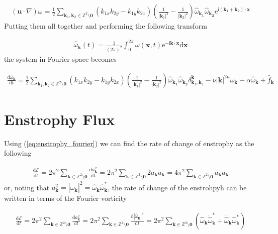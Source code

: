 \documentclass[9pt]{article}
\newcommand{\der}[2]{\frac{\mathrm{d}#1}{\mathrm{d}#2}}          	 %
\newcommand{\ii}{\mathrm{i}}      								  %
\newcommand{\e}{\mathrm{e}}      								  %
\newcommand{\bfu}{\mathbf{u}}											%
\newcommand{\omegahat}[1]{\hat{\omega}_{ \mathbf{#1} } }								%
\newcommand{\bfx}{\mathbf{x}}								%
\newcommand{\bfk}{\mathbf{k}}								%
\newcommand{\bfkn}[1]{\mathbf{k}_{#1}}								%
\begin{document}
\begin{align}
	\left(\bfu \cdot \nabla\right) \omega = \frac{1}{2} \sum_{\mathbf{k}_1, \mathbf{k}_2\in \mathbb{Z}^2\setminus \mathbf{0}}\left(k_{1x}k_{2y} - k_{1y}k_{2x}\right) \left(\frac{1}{|\bfkn{1}|^2} - \frac{1}{|\bfkn{2}|^2}\right) \omegahat{\bfkn{1}}\omegahat{\bfkn{2}} \e^{\ii (\bfkn{1} + \bfkn{2}) \cdot \bfx}
\end{align}
Putting them all together and performing the following transform

\begin{align}
	\omegahat{\bfk} (t)= \frac{1}{(2\pi)^2}\int_0^{2\pi}\omega(\bfx, t)\e^{-\ii \bfk \cdot \bfx}\mathrm{d}\mathbf{x}
\end{align}
the system in Fourier space becomes

\begin{align}
	\der{\omegahat{k}}{t} = \frac{1}{2}	\sum_{\mathbf{k}_1, \mathbf{k}_2\in \mathbb{Z}^2\setminus \mathbf{0}}\left(k_{1x}k_{2y} - k_{1y}k_{2x}\right) \left(\frac{1}{|\bfkn{1}|^2} - \frac{1}{|\bfkn{2}|^2}\right) \omegahat{\bfkn{1}}\omegahat{\bfkn{2}} \delta_{\bfkn{1}, \bfkn{2}}^{\bfk} - \nu |\bfk|^{2n}\omegahat{k} - \alpha\omegahat{k} + \hat{f}_{\bfk}
	\label{eq:vort_eqn_fourier_space}
\end{align}

\section{Enstrophy Flux}

Using (\ref{eq:enstrophy_fourier}) we can find the rate of change of enstrophy as the following

\begin{align}
\der{\mathcal{E}}{t} = 2\pi^2 \sum_{\mathbf{k}\in \mathbb{Z}^2\setminus \mathbf{0}} \der{a_{\bfk}^2}{t}  = 2\pi^2 \sum_{\mathbf{k}\in \mathbb{Z}^2\setminus \mathbf{0}} 2 a_{\bfk} \dot{a}_{\bfk} = 4\pi^2 \sum_{\mathbf{k}\in \mathbb{Z}^2\setminus \mathbf{0}} a_{\bfk} \dot{a}_{\bfk}
\end{align}
or, noting that $a_{\bfk}^2 = |\hat{\omega}_{\bfk}|^2 = \hat{\omega}_{\bfk}\hat{\omega}_{\bfk}^{*}$, the rate of change of the enstrohpyh can be written in terms of the Fourier vorticity


\begin{align}
	\der{\mathcal{E}}{t} = 2\pi^2 \sum_{\mathbf{k}\in \mathbb{Z}^2\setminus \mathbf{0}} \der{a_{\bfk}^2}{t} = 2\pi^2 \sum_{\mathbf{k}\in \mathbb{Z}^2\setminus \mathbf{0}}\der{|\hat{\omega}_{\bfk}|^2}{t} = 2\pi^2 \sum_{\mathbf{k}\in \mathbb{Z}^2\setminus \mathbf{0}} (\hat{\omega}_{\bfk} \dot{\hat{\omega}}^{*}_{\bfk} + \dot{\hat{\omega}}_{\bfk} \hat{\omega}^{*}_{\bfk})
\end{align}
\end{document}
